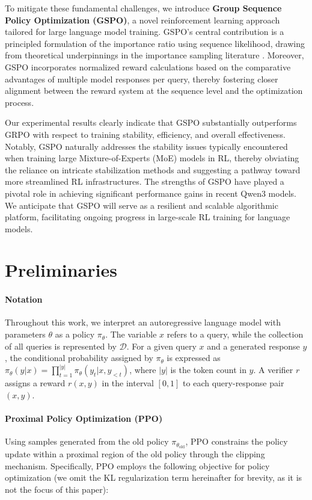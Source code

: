 To mitigate these fundamental challenges, we introduce \textbf{Group Sequence Policy Optimization (GSPO)}, a novel reinforcement learning approach tailored for large language model training. GSPO’s central contribution is a principled formulation of the importance ratio using sequence likelihood, drawing from theoretical underpinnings in the importance sampling literature \citep{click}. Moreover, GSPO incorporates normalized reward calculations based on the comparative advantages of multiple model responses per query, thereby fostering closer alignment between the reward system at the sequence level and the optimization process.

Our experimental results clearly indicate that GSPO substantially outperforms GRPO with respect to training stability, efficiency, and overall effectiveness. Notably, GSPO naturally addresses the stability issues typically encountered when training large Mixture-of-Experts (MoE) models in RL, thereby obviating the reliance on intricate stabilization methods and suggesting a pathway toward more streamlined RL infrastructures. The strengths of GSPO have played a pivotal role in achieving significant performance gains in recent Qwen3 models. We anticipate that GSPO will serve as a resilient and scalable algorithmic platform, facilitating ongoing progress in large-scale RL training for language models.

\section{Preliminaries}

\paragraph{Notation}
Throughout this work, we interpret an autoregressive language model with parameters $\theta$ as a policy $\pi_\theta$. The variable $x$ refers to a query, while the collection of all queries is represented by $\mathcal{D}$. For a given query $x$ and a generated response $y$, the conditional probability assigned by $\pi_\theta$ is expressed as $\pi_\theta (y | x)=\prod_{t=1}^{|y|} \pi_\theta (y_t | x, y_{<t} )$, where $|y|$ is the token count in $y$. A verifier $r$ assigns a reward $r(x, y)$ in the interval $[0, 1]$ to each query-response pair $(x, y)$.

\paragraph{Proximal Policy Optimization (PPO)} Using samples generated from the old policy $\pi_{\theta_\text{old}}$, PPO \citep{ppo} constrains the policy update within a proximal region of the old policy through the clipping mechanism. Specifically, PPO employs the following objective for policy optimization (we omit the KL regularization term hereinafter for brevity, as it is not the focus of this paper):

